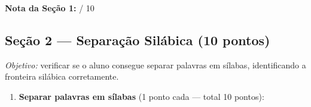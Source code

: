 \begin{avaliacao}
\medskip
\noindent\textbf{Nota da Seção 1:} \underline{\hspace{1cm}} / 10

\subsection*{Seção 2 — Separação Silábica (10 pontos)}

\textit{Objetivo:} verificar se o aluno consegue separar palavras em
sílabas, identificando a fronteira silábica corretamente.

\begin{enumerate}[resume]
  \item \textbf{Separar palavras em sílabas} (1 ponto cada — total 10 pontos):

  \begin{center}
  \end{center}
\end{enumerate}


\end{avaliacao}
